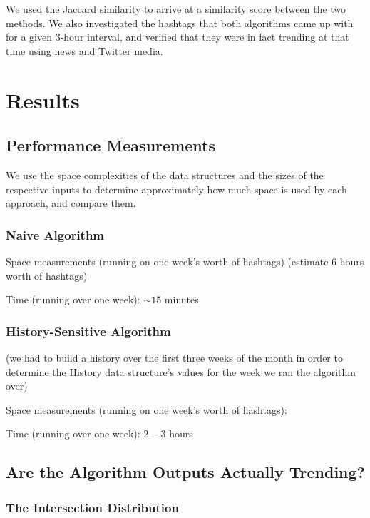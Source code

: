 \documentclass[twoside]{article}
\begin{document}
We used the Jaccard similarity to arrive at a similarity score between the two methods. We also investigated the hashtags that both algorithms came up with for a given $3$-hour interval, and verified
that they were in fact trending at that time using news and Twitter media. 


\section{Results}

\subsection{Performance Measurements}

We use the space complexities of the data structures and the sizes of the 
respective inputs to determine approximately how much space is used by each
approach, and compare them. 

\subsubsection{Naive Algorithm}

Space measurements (running on one week's worth of hashtags) (estimate 6 hours worth of hashtags)

Time (running over one week): $\sim 15$ minutes

\subsubsection{History-Sensitive Algorithm}

(we had to build a history over the first three weeks of the month
 in order to determine the History data structure's values for the week we ran
 the algorithm over)

Space measurements (running on one week's worth of hashtags):

Time (running over one week): $2 - 3$ hours

\subsection{Are the Algorithm Outputs Actually Trending?}

\subsubsection{The Intersection Distribution}
\end{document}
